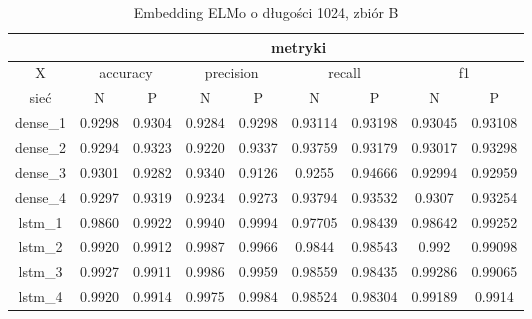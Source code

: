 \begin{table}[p] \centering
    \caption{Embedding ELMo o długości 1024, zbiór B}
    \label{tab:wyniki_elmo_B}
    \begin{tabular} {|c|c|c|c|c|c|c|c|c| }    \hline
                 & \multicolumn{8}{c|}{metryki}                                                                                                                                   \\ \hline
        X        & \multicolumn{2}{c|}{accuracy} & \multicolumn{2}{c|}{precision} & \multicolumn{2}{c|}{recall} & \multicolumn{2}{c|}{f1}                                         \\ \hline
        sieć     & N                             & P                              & N                           & P                       & N       & P       & N       & P       \\ \hline
        dense\_1 & 0.9298                        & 0.9304                         & 0.9284                      & 0.9298                  & 0.93114 & 0.93198 & 0.93045 & 0.93108 \\ \hline
        dense\_2 & 0.9294                        & 0.9323                         & 0.9220                      & 0.9337                  & 0.93759 & 0.93179 & 0.93017 & 0.93298 \\ \hline
        dense\_3 & 0.9301                        & 0.9282                         & 0.9340                      & 0.9126                  & 0.9255  & 0.94666 & 0.92994 & 0.92959 \\ \hline
        dense\_4 & 0.9297                        & 0.9319                         & 0.9234                      & 0.9273                  & 0.93794 & 0.93532 & 0.9307  & 0.93254 \\ \hline
        lstm\_1  & 0.9860                        & 0.9922                         & 0.9940                      & 0.9994                  & 0.97705 & 0.98439 & 0.98642 & 0.99252 \\ \hline
        lstm\_2  & 0.9920                        & 0.9912                         & 0.9987                      & 0.9966                  & 0.9844  & 0.98543 & 0.992   & 0.99098 \\ \hline
        lstm\_3  & 0.9927                        & 0.9911                         & 0.9986                      & 0.9959                  & 0.98559 & 0.98435 & 0.99286 & 0.99065 \\ \hline
        lstm\_4  & 0.9920                        & 0.9914                         & 0.9975                      & 0.9984                  & 0.98524 & 0.98304 & 0.99189 & 0.9914  \\ \hline

\end{tabular}
\end{table}
